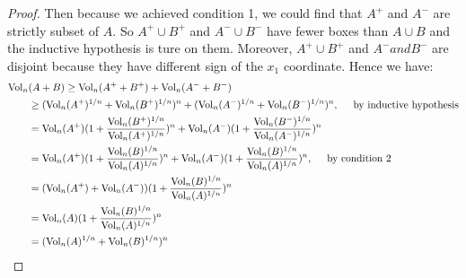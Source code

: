 \begin{proof}
  Then because we achieved condition 1, we could find that $A^+$ and $A^-$ are strictly subset of $A$. So $A^+\cup B^+$ and $A^- \cup B^-$ have fewer boxes than $A\cup B$ and the inductive hypothesis is ture on them. Moreover, $A^+\cup B^+$ and $A^- and B^-$ are disjoint because they have different sign of the $x_1$ coordinate. Hence we have:
  \begin{align*}
    \mathrm{Vol}_n&(A + B) \geq \mathrm{Vol}_n(A^+ + B^+) + \mathrm{Vol}_n(A^- + B^-) \\
    &\geq (\mathrm{Vol}_n(A^+)^{1/n} + \mathrm{Vol}_n(B^+)^{1/n})^n + (\mathrm{Vol}_n(A^-)^{1/n} + \mathrm{Vol}_n(B^-)^{1/n})^n, \hspace{0.5cm} \mbox{by inductive hypothesis}\\
    &= \mathrm{Vol}_n(A^+)(1 + \frac{\mathrm{Vol}_n(B^+)^{1/n}}{\mathrm{Vol}_n(A^+)^{1/n}})^n + \mathrm{Vol}_n(A^-)(1 + \frac{\mathrm{Vol}_n(B^-)^{1/n}}{\mathrm{Vol}_n(A^-)^{1/n}})^n \\
    &= \mathrm{Vol}_n(A^+)(1 + \frac{\mathrm{Vol}_n(B)^{1/n}}{\mathrm{Vol}_n(A)^{1/n}})^n + \mathrm{Vol}_n(A^-)(1 + \frac{\mathrm{Vol}_n(B)^{1/n}}{\mathrm{Vol}_n(A)^{1/n}})^n, \hspace{0.5cm} \mbox{by condition 2} \\
    &= (\mathrm{Vol}_n(A^+) + \mathrm{Vol}_n(A^-))(1 + \frac{\mathrm{Vol}_n(B)^{1/n}}{\mathrm{Vol}_n(A)^{1/n}})^n \\
    &= \mathrm{Vol}_n(A)(1 + \frac{\mathrm{Vol}_n(B)^{1/n}}{\mathrm{Vol}_n(A)^{1/n}})^n \\
    &= (\mathrm{Vol}_n(A)^{1/n} + \mathrm{Vol}_n(B)^{1/n})^n \qedhere
  \end{align*}
\end{proof}

